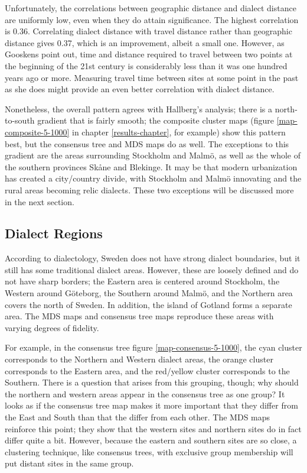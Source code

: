 Unfortunately, the correlations between geographic distance and
dialect distance are uniformly low, even when they do attain
significance. The highest correlation is 0.36. Correlating dialect
distance with travel distance rather than geographic distance gives
0.37, which is an improvement, albeit a small one. However, as
Gooskens point out, time and distance required to travel between two
points at the beginning of the 21st century is considerably less than
it was one hundred years ago or more. Measuring travel time between
sites at some point in the past as she does might provide an even
better correlation with dialect distance.

Nonetheless, the overall pattern agrees with Hallberg's analysis;
there is a north-to-south gradient that is fairly smooth; the
composite cluster maps (figure \ref{map-composite-5-1000} in chapter
\ref{results-chapter}, for example) show this pattern best, but the
consensus tree and MDS maps do as well. The exceptions to this
gradient are the areas surrounding Stockholm and Malm\"o, as well as
the whole of the southern provinces Sk\aa{}ne and Blekinge. It may be
that modern urbanization has created a city/country divide, with
Stockholm and Malm\"o innovating and the rural areas becoming relic
dialects. These two exceptions will be discussed more in the next
section.

\subsection{Dialect Regions}

According to dialectology, Sweden does not have strong dialect
boundaries, but it still has some traditional dialect areas. However,
these are loosely defined and do not have sharp borders; the Eastern
area is centered around Stockholm, the Western around G\"oteborg, the
Southern around Malm\"o, and the Northern area covers the north of
Sweden. In addition, the island of Gotland forms a separate area. The
MDS maps and consensus tree maps reproduce these areas with varying
degrees of fidelity.

For example, in the consensus tree figure \ref{map-consensus-5-1000}, the
cyan cluster corresponds to the Northern and Western dialect areas,
the orange cluster corresponds to the Eastern area, and the red/yellow
cluster corresponds to the Southern. There is a question that arises
from this grouping, though; why should the northern and western areas
appear in the consensus tree as one group? It looks as if the
consensus tree map makes it more important that they differ from the
East and South than that the differ from each other. The MDS maps
reinforce this point; they show that the western sites and northern sites
do in fact differ quite a bit. However, because the eastern and
southern sites are so close, a clustering technique, like consensus
trees, with exclusive group membership will put distant sites in the
same group.

